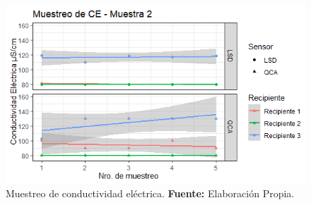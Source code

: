     \begin{figure}[H]
        \centering
        \includegraphics[width=0.75\linewidth]{Imagenes/cap4/CE_M2.png}
        \caption {Muestreo de conductividad el\'ectrica. \textbf{Fuente:}
        Elaboraci\'on Propia. }
        \label{fig:M2CE}
    \end{figure}

